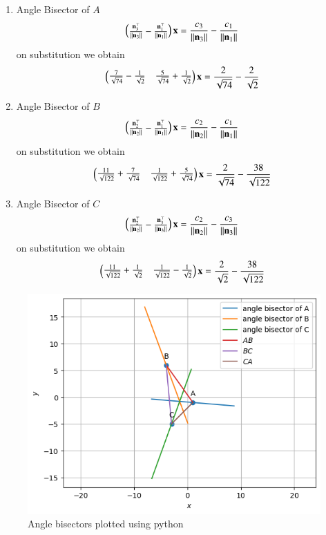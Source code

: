 \documentclass[journal,12pt,twocolumn]{IEEEtran}
\begin{document}
\begin{enumerate}
\item Angle Bisector of $A$
\begin{align}
       \begin{pmatrix}\frac{\mathbf{n}_3^{\top}}{\left\lVert\mathbf{n}_3\right\rVert} - \frac{\mathbf{n}_1^{\top}}{\left\lVert\mathbf{n}_1\right\rVert}\end{pmatrix}\mathbf{x}
       =
       \frac{c_3}{\left\lVert\mathbf{n}_3\right\rVert}-\frac{c_1}{\left\lVert\mathbf{n}_1\right\rVert}
\end{align}
on substitution we obtain 
\begin{align}
\begin{pmatrix}
\frac{7}{\sqrt{74}}-\frac{1}{\sqrt{2}} & \frac{5}{\sqrt{74}}+\frac{1}{\sqrt{2}}\\
\end{pmatrix}
\mathbf{x}
=\frac{2}{\sqrt{74}}-\frac{2}{\sqrt{2}}
\end{align}
\item Angle Bisector of $B$
\begin{align}
       \begin{pmatrix}\frac{\mathbf{n}_2^{\top}}{\left\lVert\mathbf{n}_2\right\rVert} - \frac{\mathbf{n}_1^{\top}}{\left\lVert\mathbf{n}_1\right\rVert}\end{pmatrix}\mathbf{x}
       =
       \frac{c_2}{\left\lVert\mathbf{n}_2\right\rVert}-\frac{c_1}{\left\lVert\mathbf{n}_1\right\rVert}
\end{align}
on substitution we obtain 
\begin{align}
\begin{pmatrix}
\frac{11}{\sqrt{122}}+\frac{7}{\sqrt{74}} & \frac{1}{\sqrt{122}}+\frac{5}{\sqrt{74}}\\
\end{pmatrix}
\mathbf{x}
=\frac{2}{\sqrt{74}}-\frac{38}{\sqrt{122}}
\end{align}
\item Angle Bisector of $C$
\begin{align}
       \begin{pmatrix}\frac{\mathbf{n}_2^{\top}}{\left\lVert\mathbf{n}_2\right\rVert} - \frac{\mathbf{n}_3^{\top}}{\left\lVert\mathbf{n}_3\right\rVert}\end{pmatrix}\mathbf{x}
       =
       \frac{c_2}{\left\lVert\mathbf{n}_2\right\rVert}-\frac{c_3}{\left\lVert\mathbf{n}_3\right\rVert}
\end{align}
on substitution we obtain 
\begin{align}
\begin{pmatrix}
\frac{11}{\sqrt{122}}+\frac{1}{\sqrt{2}} & \frac{1}{\sqrt{122}}-\frac{1}{\sqrt{2}}\\
\end{pmatrix}
\mathbf{x}
=\frac{2}{\sqrt{2}}-\frac{38}{\sqrt{122}}
\end{align}
\end{enumerate}
\begin{figure}[H]
\includegraphics[width=\columnwidth]{./figs/anglebisector.png}
\caption{Angle bisectors plotted using python}
\label{fig:i_angbisector_py}
\end{figure}
\end{document}
